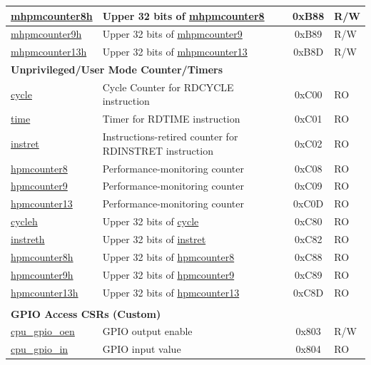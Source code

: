 \begin{longtable}{ | p{4.0cm} | p{8.4cm} | c | l | }
\hyperref[regdesc:MHPMCOUNTER8H]{mhpmcounter8h} & Upper 32 bits of \hyperref[regdesc:MHPMCOUNTER8]{mhpmcounter8} & 0xB88 & R/W \\\hline
\hyperref[regdesc:MHPMCOUNTER9H]{mhpmcounter9h} & Upper 32 bits of \hyperref[regdesc:MHPMCOUNTER9]{mhpmcounter9} & 0xB89 & R/W \\\hline
\hyperref[regdesc:MHPMCOUNTER13H]{mhpmcounter13h} & Upper 32 bits of \hyperref[regdesc:MHPMCOUNTER13]{mhpmcounter13} & 0xB8D & R/W \\\hline
\multicolumn{4}{|l|}{\textbf{Unprivileged/User Mode Counter/Timers }} \\\hline
\hyperref[regdesc:CYCLE]{cycle} & Cycle Counter for RDCYCLE instruction & 0xC00 & RO\\\hline
\hyperref[regdesc:TIME]{time} & Timer for RDTIME instruction & 0xC01 & RO \\\hline
\hyperref[regdesc:INSTRET]{instret} & Instructions-retired counter for RDINSTRET instruction & 0xC02 & RO \\\hline
\hyperref[regdesc:HPMCOUNTER8]{hpmcounter8} & Performance-monitoring counter & 0xC08 & RO \\\hline
\hyperref[regdesc:HPMCOUNTER9]{hpmcounter9} & Performance-monitoring counter & 0xC09 & RO \\\hline
\hyperref[regdesc:HPMCOUNTER13]{hpmcounter13} & Performance-monitoring counter & 0xC0D & RO \\\hline
\hyperref[regdesc:CYCLEH]{cycleh} & Upper 32 bits of \hyperref[regdesc:CYCLE]{cycle} & 0xC80 & RO \\\hline
\hyperref[regdesc:INSTRETH]{instreth} & Upper 32 bits of \hyperref[regdesc:INSTRET]{instret}  & 0xC82 & RO \\\hline
\hyperref[regdesc:HPMCOUNTER8H]{hpmcounter8h} & Upper 32 bits of \hyperref[regdesc:HPMCOUNTER8]{hpmcounter8} & 0xC88 & RO \\\hline
\hyperref[regdesc:HPMCOUNTER9H]{hpmcounter9h} & Upper 32 bits of \hyperref[regdesc:HPMCOUNTER9]{hpmcounter9} & 0xC89 & RO \\\hline
\hyperref[regdesc:HPMCOUNTER13H]{hpmcounter13h} & Upper 32 bits of \hyperref[regdesc:HPMCOUNTER13]{hpmcounter13} & 0xC8D & RO \\\hline
 \\\hline
\multicolumn{4}{|l|}{\textbf{GPIO Access CSRs (Custom)}} \\\hline
\hyperref[regdesc:GPIO_OEN]{cpu\_gpio\_oen} & GPIO output enable & 0x803 & R/W \\\hline
\hyperref[regdesc:GPIO_IN]{cpu\_gpio\_in} & GPIO input value & 0x804 & RO \\\hline

\end{longtable}
